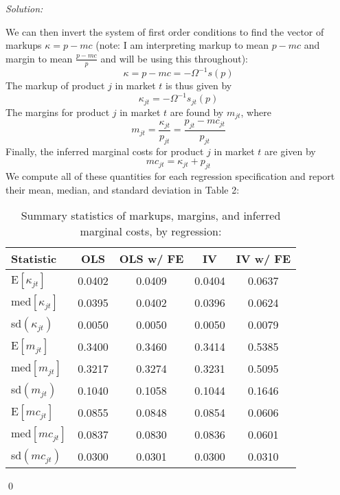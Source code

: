\documentclass[12pt]{article}
\newenvironment{problem}[2][Problem]{\begin{trivlist}
\item[\hskip \labelsep {\bfseries #1}\hskip \labelsep {\bfseries #2.}]}{\end{trivlist}}
\newenvironment{sol}
    {\emph{Solution:}
    }
    {
    \qed
    }
\begin{document}
\begin{sol}
We can then invert the system of first order conditions to find the vector of markups $\kappa = p - mc$ (note: I am interpreting markup to mean $p - mc$ and margin to mean $\frac{p - mc}{p}$ and will be using this throughout):
\[\kappa = p - mc = -\Omega^{-1}s(p)\]
The markup of product $j$ in market $t$ is thus given by
\[\kappa_{jt} = -\Omega^{-1}s_{jt}(p)\]
The margins for product $j$ in market $t$ are found by $m_{jt}$, where
\[m_{jt} = \frac{\kappa_{jt}}{p_{jt}} = \frac{p_{jt} - mc_{jt}}{p_{jt}}\]
Finally, the inferred marginal costs for product $j$ in market $t$ are given by
\[mc_{jt} = \kappa_{jt} + p_{jt}\]
We compute all of these quantities for each regression specification and report their mean, median, and standard deviation in Table 2:
\begin{center}
    \begin{table}[htbp]
        \centering
        \caption{Summary statistics of markups, margins, and inferred marginal costs, by regression:}
          \begin{tabular}{lcccc}
              \toprule
                Statistic    & OLS          & OLS w/ FE & IV & IV w/ FE         \\
              \midrule
                E$[\kappa_{jt}]$   &0.0402 &0.0409&0.0404&0.0637 \\
                med$[\kappa_{jt}]$ &0.0395 &0.0402&0.0396&0.0624   \\
                 sd$(\kappa_{jt})$ &0.0050 &0.0050&0.0050&0.0079  \\
                \midrule
                E$[m_{jt}]$        &0.3400 &0.3460&0.3414&0.5385 \\
                med$[m_{jt}]$      &0.3217 &0.3274&0.3231&0.5095   \\
                 sd$(m_{jt})$      &0.1040 &0.1058&0.1044&0.1646  \\
                 \midrule
                 E$[mc_{jt}]$      &0.0855 &0.0848&0.0854&0.0606 \\
                med$[mc_{jt}]$     &0.0837 &0.0830&0.0836&0.0601   \\
                 sd$(mc_{jt})$     &0.0300 &0.0301&0.0300&0.0310  \\
              \bottomrule
          \end{tabular}
        \label{tab:moments}
      \end{table}
\end{center}
\end{sol}
\begin{problem}{3}
\end{problem}
\end{document}
